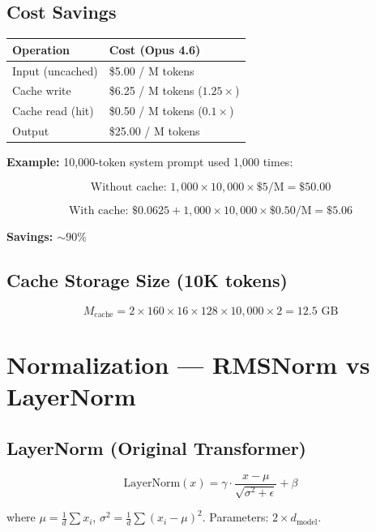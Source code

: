 \documentclass[11pt,a4paper]{article}
\begin{document}
\subsection{Cost Savings}

\begin{center}
\begin{tabular}{ll}
\toprule
\textbf{Operation} & \textbf{Cost (Opus 4.6)} \\
\midrule
Input (uncached) & \$5.00 / M tokens \\
Cache write & \$6.25 / M tokens ($1.25\times$) \\
Cache read (hit) & \$0.50 / M tokens ($0.1\times$) \\
Output & \$25.00 / M tokens \\
\bottomrule
\end{tabular}
\end{center}

\textbf{Example:} 10,000-token system prompt used 1,000 times:

$$\text{Without cache: } 1{,}000 \times 10{,}000 \times \$5/\text{M} = \$50.00$$

$$\text{With cache: } \$0.0625 + 1{,}000 \times 10{,}000 \times \$0.50/\text{M} = \$5.06$$

\textbf{Savings: $\sim 90\%$}

\subsection{Cache Storage Size (10K tokens)}

$$M_{\text{cache}} = 2 \times 160 \times 16 \times 128 \times 10{,}000 \times 2 = 12.5 \text{ GB}$$

\section{Normalization --- RMSNorm vs LayerNorm}

\subsection{LayerNorm (Original Transformer)}

$$\text{LayerNorm}(x) = \gamma \cdot \frac{x - \mu}{\sqrt{\sigma^2 + \epsilon}} + \beta$$

where $\mu = \frac{1}{d}\sum x_i$, $\sigma^2 = \frac{1}{d}\sum(x_i - \mu)^2$. Parameters: $2 \times d_{\text{model}}$.
\end{document}
